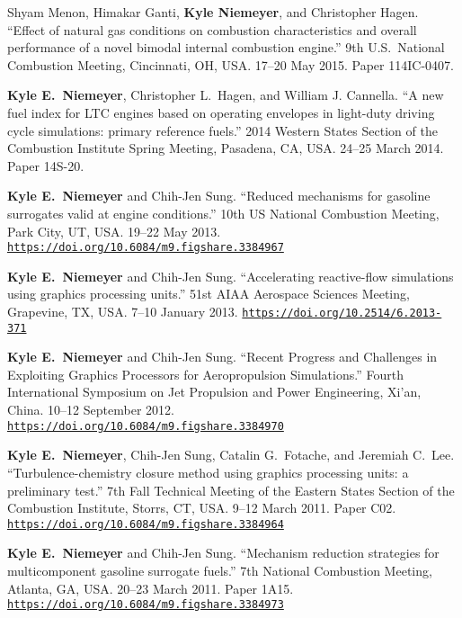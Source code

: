 \documentclass[margin,line,11pt]{res}
\makeatletter
\newlength{\bibhang}
\newlength{\bibsep}
 {\@listi \global\bibsep\itemsep \global\advance\bibsep by\parsep}
\newenvironment{bibenum*}
  {\renewcommand\labelenumi{\theenumi.}%
   \etaremune[
     topsep=0pt,
     itemsep=\bibsep,
     parsep=0pt,partopsep=0pt,
     itemindent=-\bibhang,
     leftmargin={\bibhang+\widthof{[999]}}]}
  {\endetaremune}
\newcommand*{\doi}[1]{\href{https://doi.org/#1}{\nolinkurl{https://doi.org/#1}}}
\makeatother
\begin{document}
\begin{resume}
\begin{bibenum*}
\item Shyam Menon, Himakar Ganti, \textbf{Kyle Niemeyer}, and Christopher Hagen.
``Effect of natural gas conditions on combustion characteristics and overall performance of a novel bimodal internal combustion engine.''
9th U.S.~National Combustion Meeting, Cincinnati, OH, USA.
17--20 May 2015.
Paper 114IC-0407.

\item \textbf{Kyle E.\ Niemeyer}, Christopher L.\ Hagen, and William J. Cannella.
``A new fuel index for LTC engines based on operating envelopes in light-duty driving cycle simulations: primary reference fuels.''
2014 Western States Section of the Combustion Institute Spring Meeting, Pasadena, CA, USA.
24--25 March 2014.
Paper 14S-20.

\item \textbf{Kyle E.\ Niemeyer} and Chih-Jen Sung.
``Reduced mechanisms for gasoline surrogates valid at engine conditions.''
10th US National Combustion Meeting, Park City, UT, USA.
19--22 May 2013.
\doi{10.6084/m9.figshare.3384967}

\item \textbf{Kyle E.\ Niemeyer} and Chih-Jen Sung.
``Accelerating reactive-flow simulations using graphics processing units.''
51st AIAA Aerospace Sciences Meeting, Grapevine, TX, USA.
7--10 January 2013.
\doi{10.2514/6.2013-371}

\item \textbf{Kyle E.\ Niemeyer} and Chih-Jen Sung.
``Recent Progress and Challenges in Exploiting Graphics Processors for Aeropropulsion Simulations.''
Fourth International Symposium on Jet Propulsion and Power Engineering, Xi'an, China.
10--12 September 2012. \\
\doi{10.6084/m9.figshare.3384970}

\item \textbf{Kyle E.\ Niemeyer}, Chih-Jen Sung, Catalin G.\ Fotache, and Jeremiah C.\ Lee.
``Turbulence-chemistry closure method using graphics processing units: a preliminary test.''
7th Fall Technical Meeting of the Eastern States Section of the Combustion Institute, Storrs, CT, USA.
9--12 March 2011.
Paper C02.
\doi{10.6084/m9.figshare.3384964}

\item \textbf{Kyle E.\ Niemeyer} and Chih-Jen Sung.
``Mechanism reduction strategies for multicomponent gasoline surrogate fuels.''
7th National Combustion Meeting, Atlanta, GA, USA.
20--23 March 2011.
Paper 1A15.
\doi{10.6084/m9.figshare.3384973}


\end{bibenum*}
\end{resume}
\end{document}
